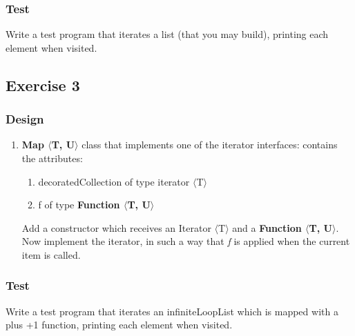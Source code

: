     \subsubsection{Test}
        Write a test program that iterates a list (that you may build), printing each element when visited.


\subsection{Exercise 3}
\subsubsection{Design}
\begin{enumerate}
    \item \textbf{Map $\langle$T, U$\rangle$} class that implements one of the iterator interfaces: contains the attributes:
        \begin{enumerate}
            \item decoratedCollection of type iterator $\langle$T$\rangle$
            \item f of type \textbf{Function $\langle$T, U$\rangle$}
        \end{enumerate}

   Add a constructor which receives an Iterator $\langle$T$\rangle$ and a \textbf{Function $\langle$T, U$\rangle$}.
   Now implement the iterator, in such a way that \textit{f} is applied when the current item is called.
\end{enumerate}

\subsubsection{Test}
Write a test program that iterates an infiniteLoopList which is mapped with a plus +1 function, printing each element when visited.




